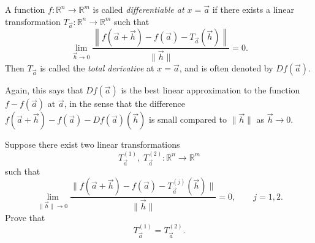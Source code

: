 \begin{definition}
A function $f:\mathbb{R}^n \to \mathbb{R}^m$ 
is called \emph{differentiable at $x=\vec a$}
if there exists a linear transformation 
$T_{\vec a}:\mathbb{R}^n \to \mathbb{R}^m$
such that
\[
\lim_{\vec h \to 0}
\frac{
\left\| f(\vec a+\vec h) - f(\vec a) - T_{\vec a}(\vec h) \right\|
}{
\|\vec h\|
}
=0.
\]
Then $T_{\vec a}$ is called the \emph{total derivative} at $x=\vec a$,
and is often denoted by $Df(\vec a)$.
\end{definition}
Again, this says that $Df(\vec a)$ is the best linear approximation to the function $f-f(\vec a)$ at $\vec a$,
in the sense that the difference $f(\vec a+\vec h)-f(\vec a)-Df(\vec a)(\vec h)$ is small compared to $\|\vec h\|$ as $\vec h \to 0$.

\begin{proposition}
Suppose there exist two linear transformations
\[
T_{\vec a}^{(1)},\; T_{\vec a}^{(2)} : \mathbb{R}^n \to \mathbb{R}^m
\]
such that
\[
\lim_{\|\vec h\|\to 0}
\frac{
\|f(\vec a+\vec h)-f(\vec a)-T_{\vec a}^{(j)}(\vec h)\|
}{
\|\vec h\|
}
=0,
\qquad j=1,2.
\]
Prove that
\[
T_{\vec a}^{(1)}=T_{\vec a}^{(2)}.
\]
\end{proposition}
